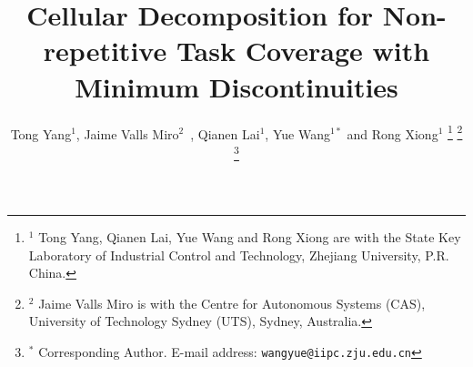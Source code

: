 \documentclass[journal]{IEEEtran}
\begin{document}
%
\title{Cellular Decomposition for Non-repetitive Task Coverage with Minimum Discontinuities}
%
%
%


\author{Tong Yang$^1$, Jaime Valls Miro$^2$~, Qianen Lai$^1$, Yue Wang$^{1*}$ and Rong Xiong$^1$
\thanks{$^1$ Tong Yang, Qianen Lai, Yue Wang and Rong Xiong are with the State Key 
Laboratory of Industrial Control and Technology, Zhejiang University, P.R. China. 
}
\thanks{$^2$ Jaime Valls Miro is with the Centre for Autonomous Systems (CAS), University of Technology Sydney (UTS), Sydney, Australia.}
\thanks{$^*$ Corresponding Author. \newline \indent
E-mail address: {\tt\small wangyue@iipc.zju.edu.cn}}
}

% 
%
\end{document}
